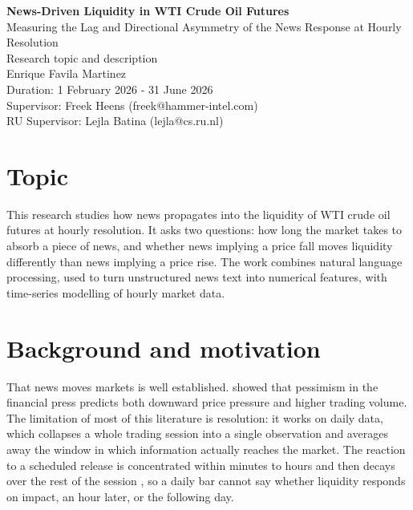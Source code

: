 \documentclass[11pt,a4paper]{article}
\begin{document}
\begin{center}
  {\Large\bfseries News-Driven Liquidity in WTI Crude Oil Futures}\\[0.3em]
  {\large Measuring the Lag and Directional Asymmetry of the News Response at Hourly Resolution}\\[0.8em]
  {\normalsize Research topic and description}\\[0.8em]
  {\large Enrique Favila Martinez}\\[0.2em]
  {\normalsize Duration: 1 February 2026 - 31 June 2026}\\
  {\normalsize Supervisor: Freek Heens (freek@hammer-intel.com)}\\
  {\normalsize RU Supervisor: Lejla Batina (lejla@cs.ru.nl)}
  
\end{center}

\vspace{0.5em}

\section{Topic}

This research studies how news propagates into the liquidity of WTI crude oil futures at hourly resolution. It asks two questions: how long the market takes to absorb a piece of news, and whether news implying a price fall moves liquidity differently than news implying a price rise. The work combines natural language processing, used to turn unstructured news text into numerical features, with time-series modelling of hourly market data.

\section{Background and motivation}

That news moves markets is well established. \citet{tetlock2007} showed that pessimism in the financial press predicts both downward price pressure and higher trading volume. The limitation of most of this literature is resolution: it works on daily data, which collapses a whole trading session into a single observation and averages away the window in which information actually reaches the market. The reaction to a scheduled release is concentrated within minutes to hours and then decays over the rest of the session \citep{ederington1993}, so a daily bar cannot say whether liquidity responds on impact, an hour later, or the following day.
\end{document}
